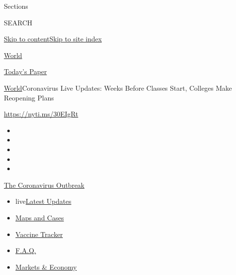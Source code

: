 Sections

SEARCH

\protect\hyperlink{site-content}{Skip to
content}\protect\hyperlink{site-index}{Skip to site index}

\href{https://www.nytimes.com/section/world}{World}

\href{https://myaccount.nytimes.com/auth/login?response_type=cookie\&client_id=vi}{}

\href{https://www.nytimes.com/section/todayspaper}{Today's Paper}

\href{/section/world}{World}\textbar{}Coronavirus Live Updates: Weeks
Before Classes Start, Colleges Make Reopening Plans

\href{https://nyti.ms/30EIgRt}{https://nyti.ms/30EIgRt}

\begin{itemize}
\item
\item
\item
\item
\item
\end{itemize}

\href{https://www.nytimes.com/news-event/coronavirus?action=click\&pgtype=Article\&state=default\&region=TOP_BANNER\&context=storylines_menu}{The
Coronavirus Outbreak}

\begin{itemize}
\tightlist
\item
  live\href{https://www.nytimes.com/2020/08/08/world/coronavirus-updates.html?action=click\&pgtype=Article\&state=default\&region=TOP_BANNER\&context=storylines_menu}{Latest
  Updates}
\item
  \href{https://www.nytimes.com/interactive/2020/us/coronavirus-us-cases.html?action=click\&pgtype=Article\&state=default\&region=TOP_BANNER\&context=storylines_menu}{Maps
  and Cases}
\item
  \href{https://www.nytimes.com/interactive/2020/science/coronavirus-vaccine-tracker.html?action=click\&pgtype=Article\&state=default\&region=TOP_BANNER\&context=storylines_menu}{Vaccine
  Tracker}
\item
  \href{https://www.nytimes.com/interactive/2020/world/coronavirus-tips-advice.html?action=click\&pgtype=Article\&state=default\&region=TOP_BANNER\&context=storylines_menu}{F.A.Q.}
\item
  \href{https://www.nytimes.com/live/2020/08/07/business/stock-market-today-coronavirus?action=click\&pgtype=Article\&state=default\&region=TOP_BANNER\&context=storylines_menu}{Markets
  \& Economy}
\end{itemize}

